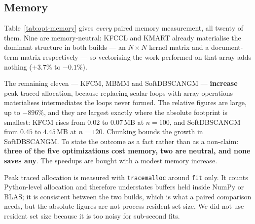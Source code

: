 \documentclass[twoside,11pt]{article}
\begin{document}
\subsection{Memory}

Table~\ref{tab:opt-memory} gives \emph{every} paired memory measurement, all
twenty of them. Nine are memory-neutral: KFCCL and KMART already materialise
the dominant structure in both builds --- an $N \times N$ kernel matrix and a
document-term matrix respectively --- so vectorising the work performed on
that array adds nothing ($+3.7\%$ to $-0.1\%$).

The remaining eleven --- KFCM, MBMM and SoftDBSCANGM --- \textbf{increase}
peak traced allocation, because replacing scalar loops with array operations
materialises intermediates the loops never formed. The relative figures are
large, up to $-896\%$, and they are largest exactly where the absolute
footprint is smallest: KFCM rises from $0.02$ to $0.07$\,MB at $n = 100$, and
SoftDBSCANGM from $0.45$ to $4.45$\,MB at $n = 120$. Chunking bounds the
growth in SoftDBSCANGM. To state the outcome as a fact rather than as a
non-claim: \textbf{three of the five optimizations cost memory, two are
neutral, and none saves any}. The speedups are bought with a modest memory
increase.

Peak traced allocation is measured with \texttt{tracemalloc} around
\texttt{fit} only. It counts Python-level allocation and therefore understates
buffers held inside NumPy or BLAS; it is consistent between the two builds,
which is what a paired comparison needs, but the absolute figures are not
process resident set size. We did not use resident set size because it is too
noisy for sub-second fits.
\end{document}
